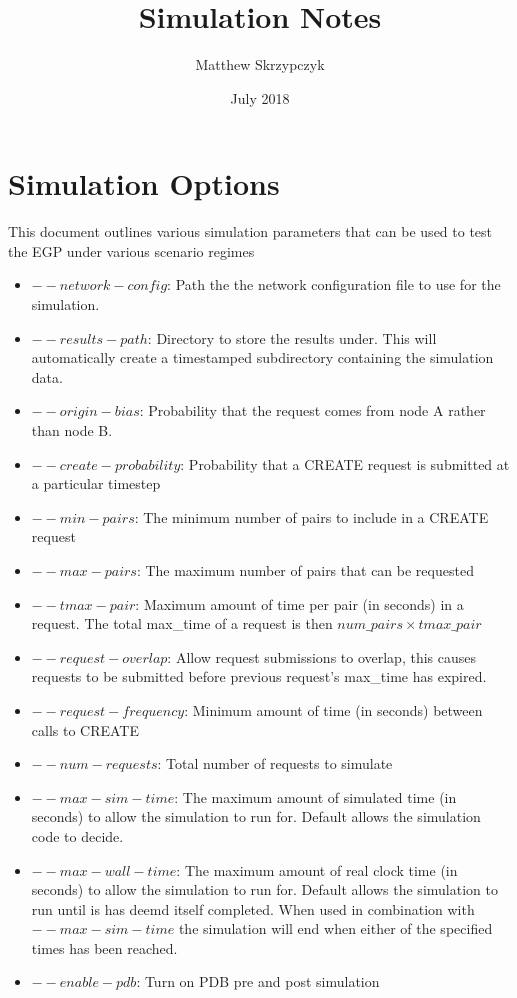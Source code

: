 \documentclass{article}
\title{Simulation Notes}
\author{Matthew Skrzypczyk}
\date{July 2018}
\begin{document}
\maketitle

\section{Simulation Options}
This document outlines various simulation parameters that can be used to test the EGP under various scenario regimes
\begin{itemize}
    \item $--network-config$: Path the the network configuration file to use for the simulation.
    \item $--results-path$: Directory to store the results under.  This will automatically create a timestamped subdirectory containing the simulation data.
    \item $--origin-bias$: Probability that the request comes from node A rather than node B.
    \item $--create-probability$: Probability that a CREATE request is submitted at a particular timestep
    \item $--min-pairs$: The minimum number of pairs to include in a CREATE request
    \item $ --max-pairs$: The maximum number of pairs that can be requested
    \item $--tmax-pair$: Maximum amount of time per pair (in seconds) in a request.  The total max\_time of a request is then $num\_pairs \times tmax\_pair$
    \item $--request-overlap$: Allow request submissions to overlap, this causes requests to be submitted before previous request's max\_time has expired.
    \item $--request-frequency$: Minimum amount of time (in seconds) between calls to CREATE
    \item $--num-requests$: Total number of requests to simulate
    \item $--max-sim-time$: The maximum amount of simulated time (in seconds) to allow the simulation to run for.  Default allows the simulation code to
    decide.
    \item $--max-wall-time$: The maximum amount of real clock time (in seconds) to allow the simulation to run for.  Default allows the simulation to run until is has deemd itself completed.  When used in combination with $--max-sim-time$ the simulation will end when either of the specified times has been reached.
    \item $--enable-pdb$: Turn on PDB pre and post simulation
\end{itemize}
\end{document}
